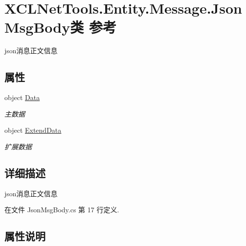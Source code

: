 \hypertarget{class_x_c_l_net_tools_1_1_entity_1_1_message_1_1_json_msg_body}{}\section{X\+C\+L\+Net\+Tools.\+Entity.\+Message.\+Json\+Msg\+Body类 参考}
\label{class_x_c_l_net_tools_1_1_entity_1_1_message_1_1_json_msg_body}


json消息正文信息  


\subsection*{属性}
\begin{DoxyCompactItemize}
\item 
object \hyperlink{class_x_c_l_net_tools_1_1_entity_1_1_message_1_1_json_msg_body_a8bf6d68ba33b65eac5431b4d2873e719}{Data}
\begin{DoxyCompactList}\small\item\em 主数据 \end{DoxyCompactList}\item 
object \hyperlink{class_x_c_l_net_tools_1_1_entity_1_1_message_1_1_json_msg_body_a0382629d68979ea8a39383a1d9891ab7}{Extend\+Data}
\begin{DoxyCompactList}\small\item\em 扩展数据 \end{DoxyCompactList}\end{DoxyCompactItemize}


\subsection{详细描述}
json消息正文信息 



在文件 Json\+Msg\+Body.\+cs 第 17 行定义.



\subsection{属性说明}
